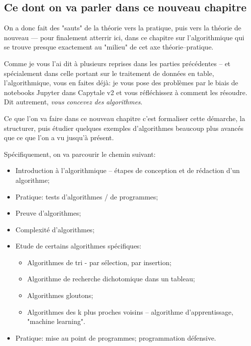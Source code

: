 \documentclass[12pt]{article}
\begin{document}
	\subsection{Ce dont on va parler dans ce nouveau chapitre}
	On a donc fait des "sauts" de la théorie vers la pratique, puis vers la théorie de nouveau --- pour finalement atterrir ici, dans ce chapitre sur l'algorithmique qui se trouve presque exactement au "milieu" de cet axe théorie--pratique.
	
	Comme je vous l'ai dit à plusieurs reprises dans les parties précédentes -- et spécialement dans celle portant sur le traitement de données en table, l'algorithmique, vous en faites déjà: je vous pose des problèmes par le biais de notebooks Jupyter dans Capytale v2 et vous réfléchissez à comment les résoudre. Dit autrement, \textit{vous concevez des algorithmes}.
	
	Ce que l'on va faire dans ce nouveau chapitre c'est formaliser cette démarche, la structurer, puis étudier quelques exemples d'algorithmes beaucoup plus avancés que ce que l'on a vu jusqu'à présent.
	
	Spécifiquement, on va parcourir le chemin suivant:
	\begin{itemize}
		\item Introduction à l'algorithmique -- étapes de conception et de rédaction d'un algorithme;
		\item Pratique: tests d'algorithmes / de programmes;
		\item Preuve d'algorithmes;
		\item Complexité d'algorithmes;
		\item Etude de certains algorithmes spécifiques:
		\begin{itemize}
			\item Algorithmes de tri - par sélection, par insertion;
			\item Algorithme de recherche dichotomique dans un tableau;
			\item Algorithmes gloutons;
			\item Algorithmes des k plus proches voisins -- algorithme d'apprentissage, "machine learning".
		\end{itemize}
		\item Pratique: mise au point de programmes; programmation défensive.
	\end{itemize}
	
\end{document}
